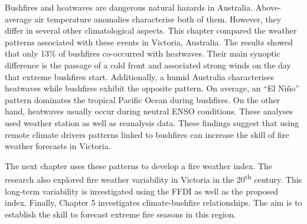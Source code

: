 Bushfires and heatwaves are dangerous natural hazards in Australia.
Above-average air temperature anomalies characterise both of them.
However, they differ in several other climatological aspects. This
chapter compared the weather patterns associated with these events
in Victoria, Australia. The results showed that only 13\% of bushfires
co-occurred with heatwaves. Their main synoptic difference is 
the passage of a cold front and associated strong winds on the day that extreme bushfires start.  
Additionally, a humid Australia characterises
heatwaves while bushfires exhibit the opposite pattern. On average,
an ``El Ni\~no'' pattern dominates the tropical Pacific Ocean during
bushfires. On the other hand, heatwaves usually occur during neutral
ENSO conditions. These analyses used weather station as well as reanalysis
data. These findings suggest that using remote climate drivers patterns
linked to bushfires can increase the skill of fire weather forecasts
in Victoria.

The next chapter uses these patterns to develop a fire weather index.
The research also explored fire weather variability in Victoria in
the 20\textsuperscript{th} century. This long-term variability is
investigated using the FFDI as well as the proposed index. Finally,
Chapter 5 investigates climate-bushfire relationships. The aim is
to establish the skill to forecast extreme fire seasons in this region.